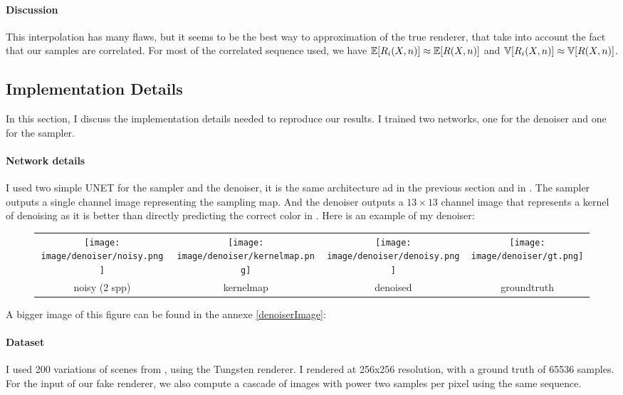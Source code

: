 \documentclass{classeENS}
\begin{document}
\paragraph*{Discussion} This interpolation has many flaws, but it seems to be 
 the best way to approximation of the true renderer, that take into 
 account the fact that our samples are correlated. For most of the correlated sequence used, 
 we have $\mathbb E[R_i(X,n)] \approx \mathbb E[R(X,n)]$ and $\mathbb V[R_i(X,n)] \approx \mathbb V[R(X,n)]$.

\subsection{Implementation Details}

In this section, I discuss the implementation details needed to reproduce 
our results. I trained two networks, one for the denoiser and one 
for the sampler.

\paragraph*{Network details} I used two simple UNET for the sampler and the denoiser, 
it is the same architecture ad in the previous section and in \cite{kuznetsov2018deep}. 
The sampler outputs a single channel image representing the sampling map. And the denoiser
outputs a $13\times13$ channel image that represents a kernel of denoising as it 
is better than directly predicting the correct color in \cite{10.1145/3072959.3073708}.
Here is an example of my denoiser:

\begin{figure}[H]
    \centering
    \begin{tabular}{cccc}
    \texttt{[image: image/denoiser/noisy.png]}
    & \texttt{[image: image/denoiser/kernelmap.png]}
    & \texttt{[image: image/denoiser/denoisy.png]}
    & \texttt{[image: image/denoiser/gt.png]} \\
    noisy (2 spp) & kernelmap & denoised & groundtruth \\
    \end{tabular}
\end{figure}
A bigger image of this figure can be found in the annexe \ref{denoiserImage}:

\paragraph*{Dataset} I used 200 variations of scenes from \cite{resources16}, using 
the Tungsten renderer. I rendered at 256x256 resolution, with a ground 
truth of 65536 samples. For the input of our fake renderer, we also 
compute a cascade of images with power two samples per pixel using the 
same sequence.
\end{document}

